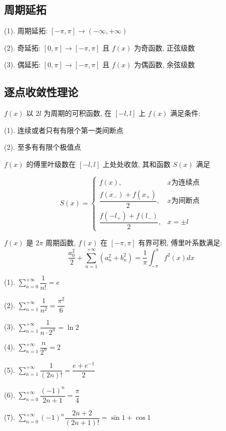 \subsection{周期延拓}
\begin{definition}[周期延拓]
	(1). 周期延拓: $[-\pi,\pi] \rightarrow (-\infty,+\infty)$

	(2). 奇延拓: $[0,\pi] \rightarrow [-\pi,\pi]$ 且 $f(x)$ 为奇函数, 正弦级数

	(3). 偶延拓: $[0,\pi] \rightarrow [-\pi,\pi]$ 且 $f(x)$ 为偶函数, 余弦级数
\end{definition}

\subsection{逐点收敛性理论}
\begin{theorem}[狄利克雷收敛定理]
$f(x)$ 以 $2l$ 为周期的可积函数, 在 $[-l,l]$ 上 $f(x)$ 满足条件:

(1). 连续或者只有有限个第一类间断点

(2). 至多有有限个极值点

$f(x)$ 的傅里叶级数在 $[-l,l]$ 上处处收敛, 其和函数 $S(x)$ 满足 

$$S(x) = \begin{cases}
			f(x),                          & x\text{为连续点}\\
			\dfrac{f(x_{-})+f(x_{+})}{2},  & x \text{为间断点}\\
			\dfrac{f(-l_{+})+f(l_{-})}{2}, & x = \pm l  
		\end{cases}$$
\end{theorem}
\begin{theorem}[帕塞瓦尔公式]
	$f(x)$ 是 $2\pi$ 周期函数, $f(x)$ 在 $[-\pi,\pi]$ 有界可积, 傅里叶系数满足:
	$$\dfrac{a_{0}^{2}}{2} + \sum\limits_{n=1}^{+\infty}(a_{n}^{2}+b_{n}^{2}) = \dfrac{1}{\pi}\int_{-\pi}^{\pi}f^{2}(x)dx$$
\end{theorem}

\begin{corollary}[常见级数和]
(1). $\sum\limits_{n=0}^{+\infty}\dfrac{1}{n!} = e$

(2). $\sum\limits_{n=1}^{+\infty}\dfrac{1}{n^{2}} = \dfrac{\pi^{2}}{6}$

(3). $\sum\limits_{n=1}^{+\infty}\dfrac{1}{n\cdot 2^{n}} = \ln 2$

(4). $\sum\limits_{n=1}^{+\infty}\dfrac{n}{2^{n}} = 2$

(5). $\sum\limits_{n=1}^{+\infty}\dfrac{1}{(2n)!} = \dfrac{e+e^{-1}}{2}$

(6). $\sum\limits_{n=0}^{+\infty}\dfrac{(-1)^{n}}{2n+1} = \dfrac{\pi}{4}$

(7). $\sum\limits_{n=0}^{+\infty}(-1)^{n}\dfrac{2n+2}{(2n+1)!} = \sin 1 + \cos 1$
\end{corollary}

